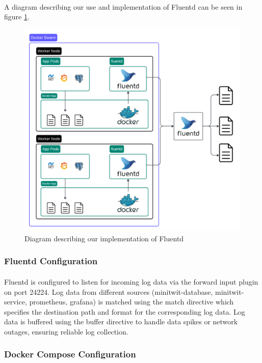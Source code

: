 \paragraph{} A diagram describing our use and implementation of Fluentd can be seen in figure \ref{fig:logging2}.
\begin{figure}[H]
	\centering
	\includegraphics[width=1\textwidth]{Logging2.png}
	\caption{Diagram describing our implementation of Fluentd}
	\label{fig:logging2}
\end{figure}

\subsubsection*{Fluentd Configuration}
\paragraph{} Fluentd is configured to listen for incoming log data via the forward input plugin on port 24224. Log data from different sources  (minitwit-database, minitwit-service, prometheus, grafana) is matched using the match directive which specifies the destination path and format for the corresponding log data. Log data is buffered using the buffer directive to handle data spikes or network outages, ensuring reliable log collection.

\subsubsection*{Docker Compose Configuration}
